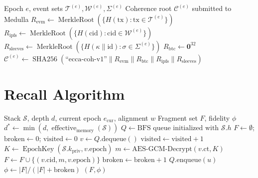 \documentclass[11pt,twocolumn]{article}
\theoremstyle{definition}
\theoremstyle{plain}
\theoremstyle{remark}
\DeclareMathOperator{\effectivebal}{effective}
\DeclareMathOperator{\merkleroot}{MerkleRoot}
\DeclareMathOperator{\epochkey}{EpochKey}
\DeclareMathOperator{\shatwofiftysix}{SHA256}
\begin{document}
\begin{algorithm}[H]
\caption{Coherence Root Computation (per epoch)}
\label{alg:coherence}
\begin{algorithmic}[1]
\Require Epoch $e$, event sets $\mathcal{T}^{(e)}, \mathcal{W}^{(e)}, \Sigma^{(e)}$
\Ensure Coherence root $\mathcal{C}^{(e)}$ submitted to Medulla
\State $R_{\mathrm{evm}} \gets \merkleroot(\{H(\mathrm{tx}) : \mathrm{tx} \in \mathcal{T}^{(e)}\})$
\State $R_{\mathrm{ipfs}} \gets \merkleroot(\{H(\mathrm{cid}) : \mathrm{cid} \in \mathcal{W}^{(e)}\})$
\State $R_{\mathrm{sleeves}} \gets \merkleroot(\{H(\kappa \| \mathrm{id}) : \sigma \in \Sigma^{(e)}\})$
\State $R_{\mathrm{btc}} \gets \mathbf{0}^{32}$ 
\State $\mathcal{C}^{(e)} \gets \shatwofiftysix(\text{``ecca-coh-v1''} \| R_{\mathrm{evm}} \| R_{\mathrm{btc}} \| R_{\mathrm{ipfs}} \| R_{\mathrm{sleeves}})$
\State {}
\end{algorithmic}
\end{algorithm}

\section{Recall Algorithm}\label{app:recall}

\begin{algorithm}[H]
\caption{Token-Bounded Recall}
\label{alg:recall}
\begin{algorithmic}[1]
\Require Stack $\mathcal{S}$, depth $d$, current epoch $e_{\mathrm{cur}}$, alignment $w$
\Ensure Fragment set $F$, fidelity $\phi$
\State $d^* \gets \min(d, \effectivebal_{\mathrm{memory}}(\mathcal{S}))$
\State $Q \gets \text{BFS queue initialized with } \mathcal{S}.h$
\State $F \gets \emptyset$; $\text{broken} \gets 0$; $\text{visited} \gets 0$
  \State $v \gets Q.\text{dequeue}()$
  \State $\text{visited} \gets \text{visited} + 1$
    \State $K \gets \epochkey(\mathcal{S}.k_{\mathrm{priv}}, v.\mathrm{epoch})$
    \State $m \gets \text{AES-GCM-Decrypt}(v.\mathrm{ct}, K)$
    \State $F \gets F \cup \{(v.\mathrm{cid}, m, v.\mathrm{epoch})\}$
  \Else
    \State $\text{broken} \gets \text{broken} + 1$
  \EndIf
   $Q.\text{enqueue}(u)$ \EndFor
\EndWhile
\State $\phi \gets |F| / (|F| + \text{broken})$
\If{$\phi < \phi_{\min}$}  \EndIf
\State \Return $(F, \phi)$
\end{algorithmic}
\end{algorithm}
\end{document}
